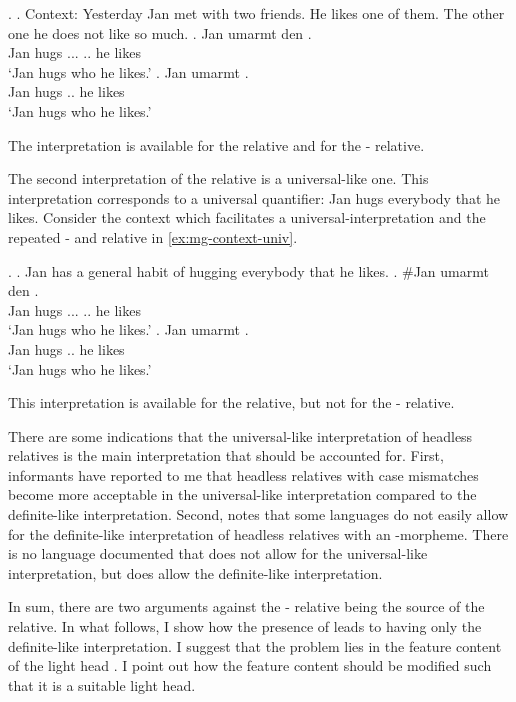 \ex.
\a. Context: Yesterday Jan met with two friends. He likes one of them. The other one he does not like so much.\label{ex:mg-context-def}
\bg. Jan umarmt den   .\\
Jan hugs ... .. he likes\\
`Jan hugs who he likes.'
\bg. Jan umarmt   .\\
Jan hugs .. he likes\\
`Jan hugs who he likes.'

The interpretation is available for the  relative and for the - relative.

The second interpretation of the  relative is a universal-like one. This interpretation corresponds to a universal quantifier: Jan hugs everybody that he likes. Consider the context which facilitates a universal-interpretation and the repeated - and  relative in \ref{ex:mg-context-univ}.

\ex.
\a. Jan has a general habit of hugging everybody that he likes.\label{ex:mg-context-univ}
\bg. \#Jan umarmt den   .\\
Jan hugs ... .. he likes\\
`Jan hugs who he likes.'
\bg. Jan umarmt   .\\
Jan hugs .. he likes\\
`Jan hugs who he likes.'

This interpretation is available for the  relative, but not for the - relative.

There are some indications that the universal-like interpretation of headless relatives is the main interpretation that should be accounted for.
First, informants have reported to me that headless relatives with case mismatches become more acceptable in the universal-like interpretation compared to the definite-like interpretation.
Second,  notes that some languages do not easily allow for the definite-like interpretation of headless relatives with an -morpheme. There is no language documented that does not allow for the universal-like interpretation, but does allow the definite-like interpretation.

In sum, there are two arguments against the - relative being the source of the  relative. In what follows, I show how the presence of  leads to having only the definite-like interpretation. I suggest that the problem lies in the feature content of the light head . I point out how the feature content should be modified such that it is a suitable light head.

